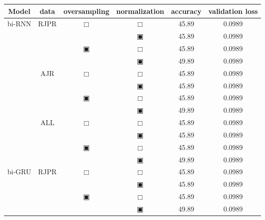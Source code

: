 \begin{table}[H]
	\renewcommand{\arraystretch}{.68}
	\begin{tabular}{|c|c|c|c|c|c|}
		\hline
		Model & data & oversampling & normalization & accuracy & validation loss\\
		\hline\hline
		\multirow{8}{*}{bi-RNN}& \multirow{4}{*}{ RJPR } & \multirow{2}{*}{$\Box$} & $\Box$ & 45.89 & 0.0989\\\cline{4-6}
				    &                    &                         & $\blackinwhitesquare$ & 45.89 & 0.0989\\\cline{3-6}
				    &                    & \multirow{2}{*}{$\blackinwhitesquare$} & $\Box$ & 45.89 & 0.0989\\\cline{4-6}
				    &                    &                         & $\blackinwhitesquare$ & 49.89 & 0.0989\\\cline{2-6}
				    & \multirow{4}{*}{ AJR } & \multirow{2}{*}{$\Box$} & $\Box$ & 45.89 & 0.0989\\\cline{4-6}
				    &                     &                         & $\blackinwhitesquare$ & 45.89 & 0.0989\\\cline{3-6}
				    &                     & \multirow{2}{*}{$\blackinwhitesquare$} & $\Box$ & 45.89 & 0.0989\\\cline{4-6}
				    &                     &                         & $\blackinwhitesquare$ & 49.89 & 0.0989\\\cline{2-6}
				    & \multirow{4}{*}{ ALL } & \multirow{2}{*}{$\Box$} & $\Box$ & 45.89 & 0.0989\\\cline{4-6}
				    &                     &                         & $\blackinwhitesquare$ & 45.89 & 0.0989\\\cline{3-6}
				    &                     & \multirow{2}{*}{$\blackinwhitesquare$} & $\Box$ & 45.89 & 0.0989\\\cline{4-6}
				    &                     &                         & $\blackinwhitesquare$ & 49.89 & 0.0989\\\cline{2-6}
		\hline\hline
		\multirow{8}{*}{bi-GRU}& \multirow{4}{*}{ RJPR } & \multirow{2}{*}{$\Box$} & $\Box$ & 45.89 & 0.0989\\\cline{4-6}
				    &                    &                         & $\blackinwhitesquare$ & 45.89 & 0.0989\\\cline{3-6}
				    &                    & \multirow{2}{*}{$\blackinwhitesquare$} & $\Box$ & 45.89 & 0.0989\\\cline{4-6}
				    &                    &                         & $\blackinwhitesquare$ & 49.89 & 0.0989\\\cline{2-6}

\end{tabular}
\end{table}
